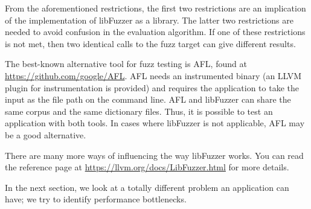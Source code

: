 From the aforementioned restrictions, the first two restrictions are an implication of the implementation of libFuzzer as a library. The latter two restrictions are needed to avoid confusion in the evaluation algorithm. If one of these restrictions is not met, then two identical calls to the fuzz target can give different results.\par

The best-known alternative tool for fuzz testing is AFL, found at \url{https://github.com/google/AFL}. AFL needs an instrumented binary (an LLVM plugin for instrumentation is provided) and requires the application to take the input as the file path on the command line. AFL and libFuzzer can share the same corpus and the same dictionary files. Thus, it is possible to test an application with both tools. In cases where libFuzzer is not applicable, AFL may be a good alternative.\par

There are many more ways of influencing the way libFuzzer works. You can read the reference page at \url{https://llvm.org/docs/LibFuzzer.html} for more details.\par

In the next section, we look at a totally different problem an application can have; we try to identify performance bottlenecks.\par















































